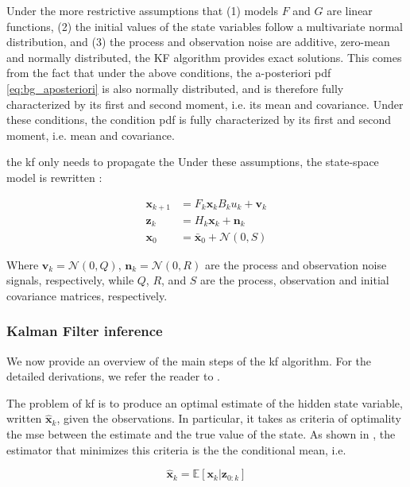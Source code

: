 Under the more restrictive assumptions that (1) models $F$ and $G$ are linear functions, (2) the initial values of the state variables follow a multivariate normal distribution, and (3) the process and observation noise are additive, zero-mean and normally distributed, the \gls{KF} algorithm provides exact solutions.
This comes from the fact that under the above conditions, the a-posteriori pdf \ref{eq:bg_aposteriori} is also normally distributed, and is therefore fully characterized by its first and second moment, i.e. its mean and covariance.
Under these conditions, the condition \gls{pdf} is fully characterized by its first and second moment, i.e. mean and covariance.

the \gls{kf} only needs to propagate the
Under these assumptions, the state-space model is rewritten :

\begin{align}
  \bm{x}_{k+1}&=F_{k}\bm{x}_{k} B_{k}u_{k} + \bm{v}_{k} \label{eq:bg_state_trans_kf}\\
  \bm{z}_{k}&= H_{k}\bm{x}_{k} + \bm{n}_{k} \label{eq:bg_proc_kf} \\
  \bm{x}_{0}&= \bm{\bar{x}}_{0} + \mathcal{N}(0,S) \label{eq:bg_init_kf}
\end{align}

Where $\bm{v}_{k}=\mathcal{N}(0,Q)$, $\bm{n}_{k}=\mathcal{N}(0,R)$ are the process and observation noise signals, respectively, while $Q$, $R$, and $S$ are the process, observation and initial covariance matrices, respectively.

\subsubsection{Kalman Filter inference}
We now provide an overview of the main steps of the \gls{kf} algorithm.
For the detailed derivations, we refer the reader to \cite{thacker98}.

The problem of \gls{kf} is to produce an optimal estimate of the hidden state variable, written $\bm{\hat x}_{k}$, given the observations.
In particular, it takes as criteria of optimality the \gls{mse} between the estimate and the true value of the state.
As shown in \cite{ribeiro04}, the estimator that minimizes this criteria is the the conditional mean, i.e.

\begin{equation}
  \label{eq:bg_cond_mean}
  \bm{\hat x}_{k} = \mathbb{E}[\bm{x}_{k}|\bm{z}_{0:k}]
\end{equation}

